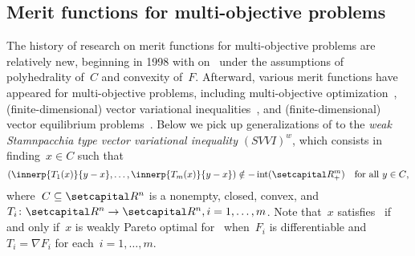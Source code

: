 \documentclass[../../main]{subfiles}
\begin{document}
\subsection{Merit functions for multi-objective problems} 
The history of research on merit functions for multi-objective problems are relatively new, beginning in 1998 with \textcite{Chen1998} on~ under the assumptions of polyhedrality of~$C$ and convexity of~$F$.
Afterward, various merit functions have appeared for multi-objective problems, including multi-objective optimization~\cite{Liu2009,Dutta2017}, (finite-dimensional) vector variational inequalities~\cite{Chen2000,Konnov2005,Li2005,Yang2002,Yang2003,Charitha2010,Li2010}, and (finite-dimensional) vector equilibrium problems~\cite{Huang2007,Li2005,Li2007,Li2006,Mastroeni2003}.
Below we pick up generalizations of  to the \emph{weak Stamnpacchia type vector variational inequality} $(SVVI)^w$, which consists in finding~$x \in C$ such that
\begin{equation} \label{eq:SVVIw}
    (\innerp{T_1(x)}{y - x}, \dots, \innerp{T_m(x)}{y - x}) \notin - \interior(\setRpos^m) \forallcondition{y \in C}
,\end{equation} 
where~$C \subseteq \setR^n$ is a nonempty, closed, convex, and $T_i \colon \setR^n \to \setR^n, i = 1, \dots, m$.
Note that~$x$ satisfies~ if and only if~$x$ is weakly Pareto optimal for~ when~$F_i$ is differentiable and~$T_i = \nabla F_i$ for each~$i = 1, \dots, m$.
\end{document}
